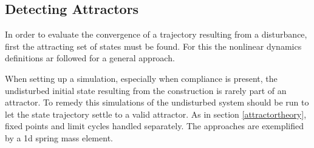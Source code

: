 









\subsection{Detecting Attractors} \label{attractors}

In order to evaluate the convergence of a trajectory resulting from a disturbance, first the attracting set of states must be found. For this the nonlinear dynamics definitions ar followed for a general approach.


When setting up a simulation, especially when compliance is present, the undisturbed initial state resulting from the construction is rarely part of an attractor. To remedy this simulations of the undisturbed system should be run to let the state trajectory settle to a valid attractor. As in section \ref{attractortheory}, fixed points and limit cycles handled separately. The approaches are exemplified by a 1d spring mass element. 

